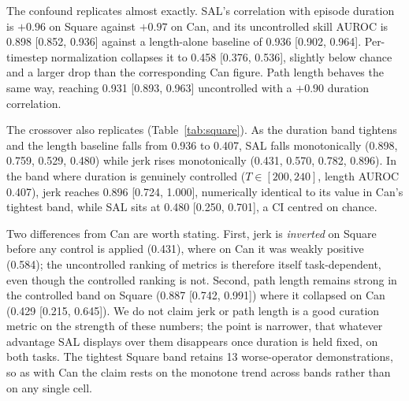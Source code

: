 \documentclass[10pt]{article}
\begin{document}
The confound replicates almost exactly. SAL's correlation with episode
duration is $+0.96$ on Square against $+0.97$ on Can, and its uncontrolled
skill AUROC is 0.898 [0.852, 0.936] against a length-alone baseline of 0.936
[0.902, 0.964]. Per-timestep normalization collapses it to 0.458 [0.376,
0.536], slightly below chance and a larger drop than the corresponding Can
figure. Path length behaves the same way, reaching 0.931 [0.893, 0.963]
uncontrolled with a $+0.90$ duration correlation.

The crossover also replicates (Table~\ref{tab:square}). As the duration band
tightens and the length baseline falls from 0.936 to 0.407, SAL falls
monotonically (0.898, 0.759, 0.529, 0.480) while jerk rises monotonically
(0.431, 0.570, 0.782, 0.896). In the band where duration is genuinely
controlled ($T \in [200,240]$, length AUROC 0.407), jerk reaches 0.896
[0.724, 1.000], numerically identical to its value in Can's tightest band,
while SAL sits at 0.480 [0.250, 0.701], a CI centred on chance.

Two differences from Can are worth stating. First, jerk is \emph{inverted}
on Square before any control is applied (0.431), where on Can it was weakly
positive (0.584); the uncontrolled ranking of metrics is therefore itself
task-dependent, even though the controlled ranking is not. Second, path
length remains strong in the controlled band on Square (0.887 [0.742,
0.991]) where it collapsed on Can (0.429 [0.215, 0.645]). We do not claim
jerk or path length is a good curation metric on the strength of these
numbers; the point is narrower, that whatever advantage SAL displays over
them disappears once duration is held fixed, on both tasks. The tightest
Square band retains 13 worse-operator demonstrations, so as with Can the
claim rests on the monotone trend across bands rather than on any single
cell.
\end{document}
